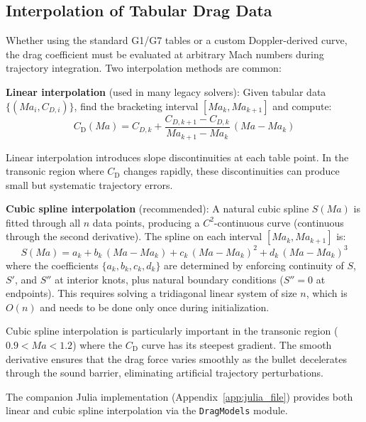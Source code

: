 \documentclass[11pt,twoside,openright]{report}
\newcommand{\Cd}{C_{\mathrm{D}}}
\newcommand{\Mach}{\mathit{Ma}}
\begin{document}
\subsection{Interpolation of Tabular Drag Data}
\label{sec:interpolation}

Whether using the standard G1/G7 tables or a custom Doppler-derived curve, the drag coefficient must be evaluated at arbitrary Mach numbers during trajectory integration. Two interpolation methods are common:

\textbf{Linear interpolation} (used in many legacy solvers): Given tabular data $\{(\Mach_i, C_{D,i})\}$, find the bracketing interval $[\Mach_k, \Mach_{k+1}]$ and compute:
\begin{equation}
  \Cd(\Mach) = C_{D,k} + \frac{C_{D,k+1} - C_{D,k}}{\Mach_{k+1} - \Mach_k}\,(\Mach - \Mach_k)
  \label{eq:linear_interp}
\end{equation}

Linear interpolation introduces slope discontinuities at each table point. In the transonic region where $\Cd$ changes rapidly, these discontinuities can produce small but systematic trajectory errors.

\textbf{Cubic spline interpolation} (recommended): A natural cubic spline $S(\Mach)$ is fitted through all $n$ data points, producing a $C^2$-continuous curve (continuous through the second derivative). The spline on each interval $[\Mach_k, \Mach_{k+1}]$ is:
\begin{equation}
  S(\Mach) = a_k + b_k\,(\Mach - \Mach_k) + c_k\,(\Mach - \Mach_k)^2 + d_k\,(\Mach - \Mach_k)^3
  \label{eq:cubic_spline}
\end{equation}
where the coefficients $\{a_k, b_k, c_k, d_k\}$ are determined by enforcing continuity of $S$, $S'$, and $S''$ at interior knots, plus natural boundary conditions ($S'' = 0$ at endpoints). This requires solving a tridiagonal linear system of size $n$, which is $O(n)$ and needs to be done only once during initialization.

Cubic spline interpolation is particularly important in the transonic region ($0.9 < \Mach < 1.2$) where the $\Cd$ curve has its steepest gradient. The smooth derivative ensures that the drag force varies smoothly as the bullet decelerates through the sound barrier, eliminating artificial trajectory perturbations.

The companion Julia implementation (Appendix~\ref{app:julia_file}) provides both linear and cubic spline interpolation via the \texttt{DragModels} module.
\end{document}
